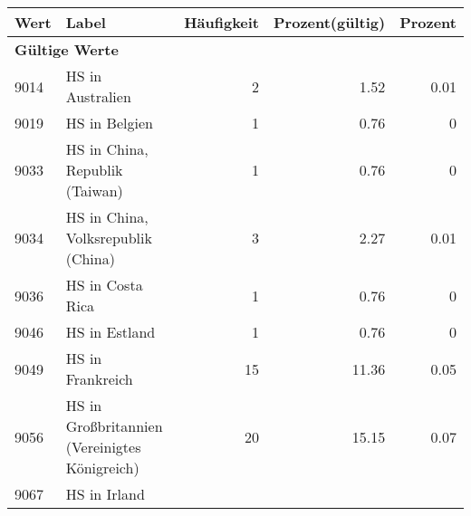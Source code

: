      \begin{longtable}{lXrrr}
     \toprule
     \textbf{Wert} & \textbf{Label} & \textbf{Häufigkeit} & \textbf{Prozent(gültig)} & \textbf{Prozent} \\
     \endhead
     \midrule
     \multicolumn{5}{l}{\textbf{Gültige Werte}}\\
        9014 & \multicolumn{1}{X}{HS in Australien} & %
          \num{2} &
          \num[round-mode=places,round-precision=2]{1,52} &
          \num[round-mode=places,round-precision=2]{0,01} \\
        9019 & \multicolumn{1}{X}{HS in Belgien} & %
          \num{1} &
          \num[round-mode=places,round-precision=2]{0,76} &
          \num[round-mode=places,round-precision=2]{0} \\
        9033 & \multicolumn{1}{X}{HS in China, Republik (Taiwan)} & %
          \num{1} &
          \num[round-mode=places,round-precision=2]{0,76} &
          \num[round-mode=places,round-precision=2]{0} \\
        9034 & \multicolumn{1}{X}{HS in China, Volksrepublik (China)} & %
          \num{3} &
          \num[round-mode=places,round-precision=2]{2,27} &
          \num[round-mode=places,round-precision=2]{0,01} \\
        9036 & \multicolumn{1}{X}{HS in Costa Rica} & %
          \num{1} &
          \num[round-mode=places,round-precision=2]{0,76} &
          \num[round-mode=places,round-precision=2]{0} \\
        9046 & \multicolumn{1}{X}{HS in Estland} & %
          \num{1} &
          \num[round-mode=places,round-precision=2]{0,76} &
          \num[round-mode=places,round-precision=2]{0} \\
        9049 & \multicolumn{1}{X}{HS in Frankreich} & %
          \num{15} &
          \num[round-mode=places,round-precision=2]{11,36} &
          \num[round-mode=places,round-precision=2]{0,05} \\
        9056 & \multicolumn{1}{X}{HS in Großbritannien (Vereinigtes Königreich)} & %
          \num{20} &
          \num[round-mode=places,round-precision=2]{15,15} &
          \num[round-mode=places,round-precision=2]{0,07} \\
        9067 & \multicolumn{1}{X}{HS in Irland} & %

\end{longtable}
